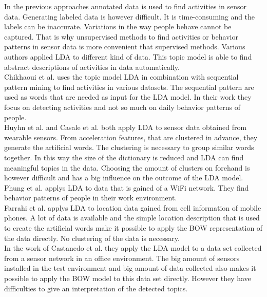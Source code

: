 In the previous approaches annotated data is used to find activities in sensor data. Generating labeled data is however difficult. It is time-consuming and the labels can be inaccurate. Variations in the way people behave cannot be captured. That is why unsupervised methods to find activities or behavior patterns in sensor data is more convenient that supervised methods. Various authors applied LDA to different kind of data. This topic model is able to find abstract descriptions of activities in data automatically.\\
Chikhaoui et al. \cite{journals/percom/ChikhaouiWP12} uses the topic model LDA in combination with sequential pattern mining to find activities in various datasets. The sequential pattern are used as words that are needed as input for the LDA model. In their work they focus on detecting activities and not so much on daily behavior patterns of people.\\
Huyhn et al. \cite{} and Casale et al. \cite{} both apply LDA to sensor data obtained from wearable sensors. From acceleration features, that are clustered in advance, they generate the artificial words. The clustering is necessary to group similar words together. In this way the size of the dictionary is reduced and LDA can find meaningful topics in the data. Choosing the amount of clusters on forehand is however difficult and has a big influence on the outcome of the LDA model.\\
Phung et al. \cite{conf/percom/PhungATVK09} applys LDA to data that is gained of a WiFi network. They find behavior patterns of people in their work environment.\\
Farrahi et al. \cite{farrahi2008daily} applys LDA to location data gained from cell information of mobile phones. A lot of data is available and the simple location description that is used to create the artificial words make it possible to apply the BOW representation of the data directly. No clustering of the data is necessary.\\
In the work of Castanedo et al. \cite{EXSY:EXSY12033} they apply the LDA model to a data set collected from a sensor network in an office environment. The big amount of sensors installed in the test environment and big amount of data collected also makes it possible to apply the BOW model to this data set directly. However they have difficulties to give an interpretation of the detected topics.\\





